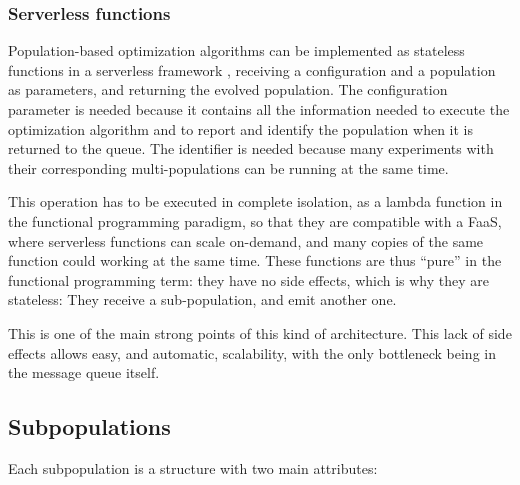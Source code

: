 \documentclass[runningheads]{llncs}
\begin{document}
\subsubsection{Serverless functions}

Population-based optimization algorithms can be implemented
as stateless functions in a serverless framework  \cite{Roberts2016},
receiving a configuration and a population as 
parameters, and returning the evolved population. 
The configuration parameter is needed because it contains all
the information needed to execute the optimization algorithm
and to report and identify the population when it is returned to the queue. 
The identifier is needed because many experiments with their corresponding 
multi-populations can be running at the same time.


This operation has to be
executed in complete isolation, as a lambda function in the functional
programming paradigm, so that they are compatible with a FaaS, where serverless
functions can scale on-demand, and many copies of the same function could
working at the same time. %
These functions are thus ``pure'' in the functional programming term:
they have no side effects, which is why they are stateless: They
receive a sub-population, and emit another one.

This is one of the main strong points of this kind of
architecture. This lack of side effects allows easy, and automatic,
scalability, with the only bottleneck being in the message queue
itself.

\subsection{Subpopulations}

Each subpopulation is a structure with two main attributes:
\end{document}
